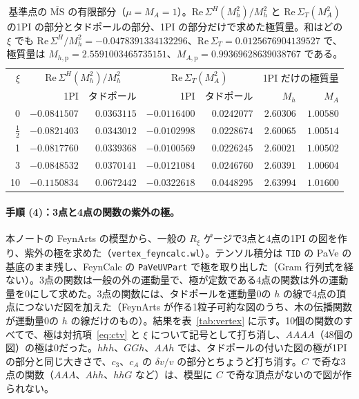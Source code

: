 \documentclass[a4paper,10pt]{ltjsarticle}
\newcommand{\MSbar}{\overline{\mathrm{MS}}}
\newcommand{\re}{\mathrm{Re}\,}
\begin{document}
\begin{table}[tbp]
\centering\small
\caption{基準点の $\MSbar$ の有限部分（$\mu=M_A=1$）。$\re\Sigma^H(M_h^2)/M_h^2$ と $\re\Sigma_T(M_A^2)$ の1PI の部分とタドポールの部分、1PI の部分だけで求めた極質量。和はどの $\xi$ でも $\re\Sigma^H/M_h^2=-0.0478391334132296$、$\re\Sigma_T=0.0125676904139527$ で、極質量は $M_{h,\mathrm p}=2.5591003465735151$、$M_{A,\mathrm p}=0.99369628639038767$ である。}
\label{tab:oneloop}
\begin{tabular}{rrrrrrr}
\toprule
$\xi$ & \multicolumn{2}{c}{$\re\Sigma^H(M_h^2)/M_h^2$} & \multicolumn{2}{c}{$\re\Sigma_T(M_A^2)$} & \multicolumn{2}{c}{1PI だけの極質量} \\
 & 1PI & タドポール & 1PI & タドポール & $M_h$ & $M_A$ \\
\midrule
0 & $-0.0841507$ & $0.0363115$ & $-0.0116400$ & $0.0242077$ & $2.60306$ & $1.00580$ \\
$\frac12$ & $-0.0821403$ & $0.0343012$ & $-0.0102998$ & $0.0228674$ & $2.60065$ & $1.00514$ \\
1 & $-0.0817760$ & $0.0339368$ & $-0.0100569$ & $0.0226245$ & $2.60021$ & $1.00502$ \\
3 & $-0.0848532$ & $0.0370141$ & $-0.0121084$ & $0.0246760$ & $2.60391$ & $1.00604$ \\
10 & $-0.1150834$ & $0.0672442$ & $-0.0322618$ & $0.0448295$ & $2.63994$ & $1.01600$ \\
\bottomrule
\end{tabular}
\end{table}

\paragraph{手順 (4)：3点と4点の関数の紫外の極。}本ノートの FeynArts の模型から、一般の $R_\xi$ ゲージで3点と4点の1PI の図を作り、紫外の極を求めた（\texttt{vertex\_feyncalc.wl}）。テンソル積分は \texttt{TID} の PaVe の基底のまま残し、FeynCalc の \texttt{PaVeUVPart} で極を取り出した（Gram 行列式を経ない）。3点の関数は一般の外の運動量で、極が定数である4点の関数は外の運動量を0にして求めた。3点の関数には、タドポールを運動量0の $h$ の線で4点の頂点につないだ図を加えた（FeynArts が作る1粒子可約な図のうち、木の伝播関数が運動量0の $h$ の線だけのもの）。結果を表~\ref{tab:vertex} に示す。10個の関数のすべてで、極は対抗項~\eqref{eq:ctv} と $\xi$ について記号として打ち消し、$AAAA$（48個の図）の極は0だった。$hhh$、$GGh$、$AAh$ では、タドポールの付いた図の極が1PI の部分と同じ大きさで、$c_3$、$c_A$ の $\delta v/v$ の部分とちょうど打ち消す。$C$ で奇な3点の関数（$AAA$、$Ahh$、$hhG$ など）は、模型に $C$ で奇な頂点がないので図が作られない。
\end{document}

